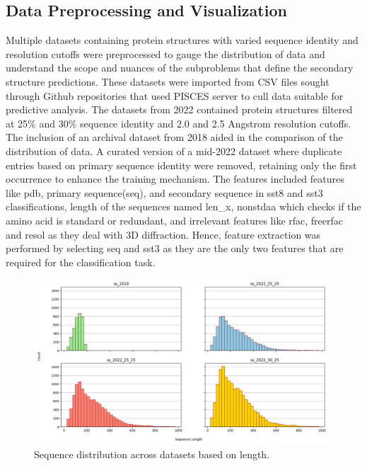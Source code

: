 \documentclass[conference]{IEEEtran}
\begin{document}
\subsection{Data Preprocessing and Visualization}
Multiple datasets containing protein structures with varied sequence identity and resolution cutoffs were preprocessed to gauge the distribution of data and understand the scope and nuances of the subproblems that define the secondary structure predictions. These datasets were imported from CSV files sought through Github repositories \cite{pisces}\cite{pisces2} that used PISCES server to cull data suitable for predictive analysis. The datasets from 2022 contained protein structures filtered at 25\% and 30\% sequence identity and 2.0 and 2.5 Angstrom resolution cutoffs. The inclusion of an archival dataset from 2018 aided in the comparison of the distribution of data. A curated version of a mid-2022 dataset where duplicate entries based on primary sequence identity were removed, retaining only the first occurrence to enhance the training mechanism. The features included features like pdb, primary sequence(seq), and secondary sequence in sst8 and sst3 classifications, length of the sequences named len\_x, nonstdaa which checks if the amino acid is standard or redundant, and irrelevant features like rfac, freerfac and resol as they deal with 3D diffraction. Hence, feature extraction was performed by selecting seq and sst3 as they are the only two features that are required for the classification task.

\begin{figure}[hbtp]
\centerline{\includegraphics[width=\linewidth]{figs/seqlength.png}}
\caption{
Sequence distribution across datasets based on length.
} 
\label{seqlength}
\end{figure}
\end{document}
